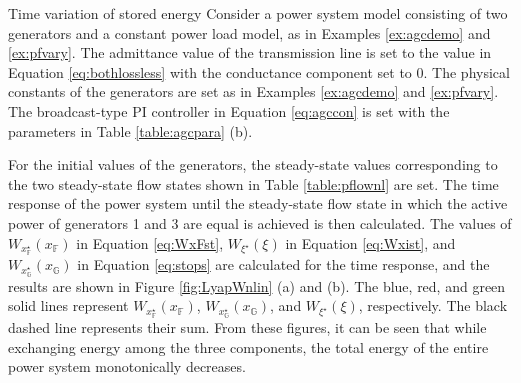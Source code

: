 \documentclass[graybox, envcountchap]{svmult}
\begin{document}
\begin{example}{Time variation of stored energy}\label{ex:nonlinene}
Consider a power system model consisting of two generators and a constant power
load model, as in Examples \ref{ex:agcdemo} and \ref{ex:pfvary}. The admittance
value of the transmission line is set to the value in Equation
\ref{eq:bothlossless} with the conductance component set to 0. The physical
constants of the generators are set as in Examples \ref{ex:agcdemo} and
\ref{ex:pfvary}.  The broadcast-type PI controller in Equation \ref{eq:agccon}
is set with the parameters in Table \ref{table:agcpara} (b).

For the initial values of the generators, the steady-state values corresponding
to the two steady-state flow states shown in Table \ref{table:pflownl} are set.
The time response of the power system until the steady-state flow state in which
the active power of generators 1 and 3 are equal is achieved is then calculated.
The values of $W_{x^{\star}_{\mathds{F}}}(x_{\mathds{F}})$ in Equation
\ref{eq:WxFst}, $W_{\xi^{\star}}(\xi)$ in Equation \ref{eq:Wxist}, and
$W_{x^{\star}_{\mathds{G}}}(x_{\mathds{G}})$ in Equation \ref{eq:stops} are
calculated for the time response, and the results are shown in Figure
\ref{fig:LyapWnlin} (a) and (b).  The blue, red, and green solid lines represent
$W_{x^{\star}_{\mathds{F}}}(x_{\mathds{F}})$,
$W_{x^{\star}_{\mathds{G}}}(x_{\mathds{G}})$, and $W_{\xi^{\star}}(\xi)$,
respectively.  The black dashed line represents their sum.  From these figures,
it can be seen that while exchanging energy among the three components, the
total energy of the entire power system monotonically decreases.
\end{example}
\end{document}
